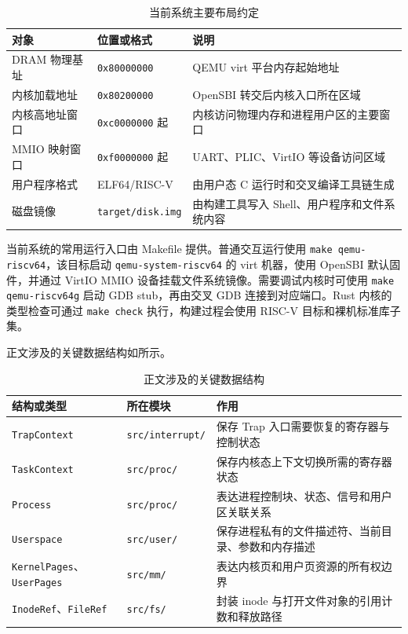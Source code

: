 \begin{table}[htbp]
  \caption{当前系统主要布局约定}\label{tab:appendix-layout}
  \centering
  \begin{tabular}{p{}p{}p{}}
    \toprule
    \textbf{对象} & \textbf{位置或格式} & \textbf{说明} \\
    \midrule
    DRAM 物理基址 & \verb|0x80000000| & QEMU virt 平台内存起始地址 \\
    内核加载地址 & \verb|0x80200000| & OpenSBI 转交后内核入口所在区域 \\
    内核高地址窗口 & \verb|0xc0000000| 起 & 内核访问物理内存和进程用户区的主要窗口 \\
    MMIO 映射窗口 & \verb|0xf0000000| 起 & UART、PLIC、VirtIO 等设备访问区域 \\
    用户程序格式 & ELF64/RISC-V & 由用户态 C 运行时和交叉编译工具链生成 \\
    磁盘镜像 & \verb|target/disk.img| & 由构建工具写入 Shell、用户程序和文件系统内容 \\
    \bottomrule
  \end{tabular}
\end{table}

\label{sec:appendix-qemu}

当前系统的常用运行入口由 Makefile 提供。普通交互运行使用 \verb|make qemu-riscv64|，该目标启动 \verb|qemu-system-riscv64| 的 virt 机器，使用 OpenSBI 默认固件，并通过 VirtIO MMIO 设备挂载文件系统镜像。需要调试内核时可使用 \verb|make qemu-riscv64g| 启动 GDB stub，再由交叉 GDB 连接到对应端口。Rust 内核的类型检查可通过 \verb|make check| 执行，构建过程会使用 RISC-V 目标和裸机标准库子集。

\label{sec:appendix-structures}

正文涉及的关键数据结构如所示。

\begin{table}[htbp]
  \caption{正文涉及的关键数据结构}\label{tab:appendix-structures}
  \centering
  \begin{tabular}{p{}p{}p{}}
    \toprule
    \textbf{结构或类型} & \textbf{所在模块} & \textbf{作用} \\
    \midrule
    \verb|TrapContext| & \verb|src/interrupt/| & 保存 Trap 入口需要恢复的寄存器与控制状态 \\
    \verb|TaskContext| & \verb|src/proc/| & 保存内核态上下文切换所需的寄存器状态 \\
    \verb|Process| & \verb|src/proc/| & 表达进程控制块、状态、信号和用户区关联关系 \\
    \verb|Userspace| & \verb|src/user/| & 保存进程私有的文件描述符、当前目录、参数和内存描述 \\
    \verb|KernelPages|、\verb|UserPages| & \verb|src/mm/| & 表达内核页和用户页资源的所有权边界 \\
    \verb|InodeRef|、\verb|FileRef| & \verb|src/fs/| & 封装 inode 与打开文件对象的引用计数和释放路径 \\
    \bottomrule
  \end{tabular}
\end{table}
